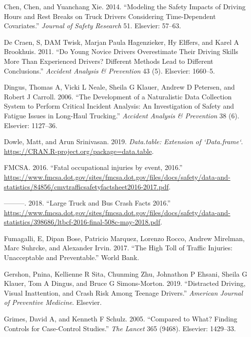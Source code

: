\documentclass[]{elsarticle} %
\begin{document}
\leavevmode\hypertarget{ref-chen2014modeling}{}%
Chen, Chen, and Yuanchang Xie. 2014. ``Modeling the Safety Impacts of Driving Hours and Rest Breaks on Truck Drivers Considering Time-Dependent Covariates.'' \emph{Journal of Safety Research} 51. Elsevier: 57--63.

\leavevmode\hypertarget{ref-de2011young}{}%
De Craen, S, DAM Twisk, Marjan Paula Hagenzieker, Hy Elffers, and Karel A Brookhuis. 2011. ``Do Young Novice Drivers Overestimate Their Driving Skills More Than Experienced Drivers? Different Methods Lead to Different Conclusions.'' \emph{Accident Analysis \& Prevention} 43 (5). Elsevier: 1660--5.

\leavevmode\hypertarget{ref-dingus2006development}{}%
Dingus, Thomas A, Vicki L Neale, Sheila G Klauer, Andrew D Petersen, and Robert J Carroll. 2006. ``The Development of a Naturalistic Data Collection System to Perform Critical Incident Analysis: An Investigation of Safety and Fatigue Issues in Long-Haul Trucking.'' \emph{Accident Analysis \& Prevention} 38 (6). Elsevier: 1127--36.

\leavevmode\hypertarget{ref-Rdatatable}{}%
Dowle, Matt, and Arun Srinivasan. 2019. \emph{Data.table: Extension of `Data.frame`}. \url{https://CRAN.R-project.org/package=data.table}.

\leavevmode\hypertarget{ref-fmcsafacts2016}{}%
FMCSA. 2016. ``Fatal occupational injuries by event, 2016.'' \url{https://www.fmcsa.dot.gov/sites/fmcsa.dot.gov/files/docs/safety/data-and-statistics/84856/cmvtrafficsafetyfactsheet2016-2017.pdf}.

\leavevmode\hypertarget{ref-fmcsareport2016}{}%
---------. 2018. ``Large Truck and Bus Crash Facts 2016.'' \url{https://www.fmcsa.dot.gov/sites/fmcsa.dot.gov/files/docs/safety/data-and-statistics/398686/ltbcf-2016-final-508c-may-2018.pdf}.

\leavevmode\hypertarget{ref-fumagalli2017high}{}%
Fumagalli, E, Dipan Bose, Patricio Marquez, Lorenzo Rocco, Andrew Mirelman, Marc Suhrcke, and Alexander Irvin. 2017. ``The High Toll of Traffic Injuries: Unacceptable and Preventable.'' World Bank.

\leavevmode\hypertarget{ref-gershon2019distracted}{}%
Gershon, Pnina, Kellienne R Sita, Chunming Zhu, Johnathon P Ehsani, Sheila G Klauer, Tom A Dingus, and Bruce G Simons-Morton. 2019. ``Distracted Driving, Visual Inattention, and Crash Risk Among Teenage Drivers.'' \emph{American Journal of Preventive Medicine}. Elsevier.

\leavevmode\hypertarget{ref-grimes2005compared}{}%
Grimes, David A, and Kenneth F Schulz. 2005. ``Compared to What? Finding Controls for Case-Control Studies.'' \emph{The Lancet} 365 (9468). Elsevier: 1429--33.
\end{document}
